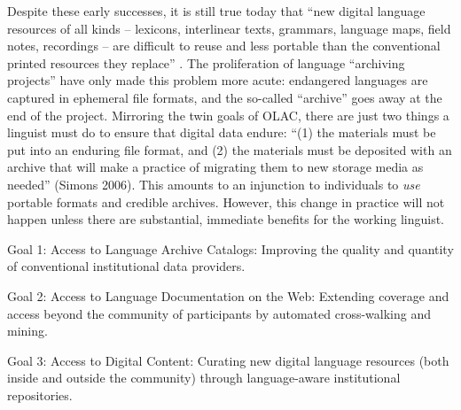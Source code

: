 
Despite these early successes, it is still true today that ``new
digital language resources of all kinds -- lexicons, interlinear
texts, grammars, language maps, field notes, recordings -- are
difficult to reuse and less portable than the conventional printed
resources they replace'' \citep{BirdSimons03language}.  The proliferation of
language ``archiving projects'' have only made this problem more
acute: endangered languages are captured in ephemeral file formats,
and the so-called ``archive'' goes away at the end of the project.
Mirroring the twin goals of OLAC, there are just two things a linguist
must do to ensure that digital data endure: ``(1) the materials must be
put into an enduring file format, and (2) the materials must be
deposited with an archive that will make a practice of migrating them
to new storage media as needed'' (Simons 2006).  This amounts to an
injunction to individuals to \emph{use} portable formats and credible
archives.  However, this change in practice will not happen unless
there are substantial, immediate benefits for the working linguist.


\vspace{1in}



Goal 1: Access to Language Archive Catalogs: Improving the quality and
quantity of conventional institutional data providers.

Goal 2: Access to Language Documentation on the Web: Extending
coverage and access beyond the community of participants by automated
cross-walking and mining.

Goal 3: Access to Digital Content: Curating new digital language
resources (both inside and outside the community) through
language-aware institutional repositories.

\vspace{1in}

